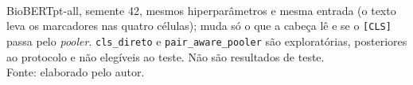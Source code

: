 \begin{table}[htbp]
  \centering
  \caption{Fatorial da ablação do \emph{pooler}: métricas das quatro cabeças no DEV.}
  \label{tab:dev_ablacao_pooler_sistemas}
  \small\setlength{\tabcolsep}{4pt}
\\[2pt]
  {\footnotesize BioBERTpt-all, semente 42, mesmos hiperparâmetros e mesma entrada (o texto leva os marcadores nas quatro células); muda só o que a cabeça lê e se o \texttt{[CLS]} passa pelo \emph{pooler}. \texttt{cls\_direto} e \texttt{pair\_aware\_pooler} são exploratórias, posteriores ao protocolo e não elegíveis ao teste. Não são resultados de teste.}\\[4pt]
  {\footnotesize Fonte: elaborado pelo autor.}
\end{table}
